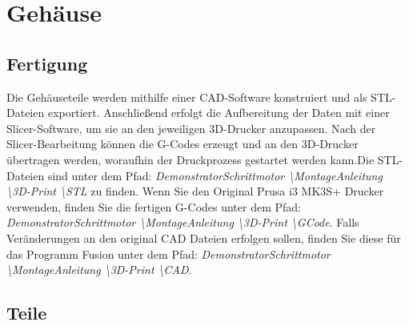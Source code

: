 %



\chapter{Gehäuse}

\section{Fertigung}

Die Gehäuseteile werden mithilfe einer CAD-Software konstruiert und als STL-Dateien exportiert. Anschließend erfolgt die Aufbereitung der Daten mit einer Slicer-Software, um sie an den jeweiligen 3D-Drucker anzupassen. Nach der Slicer-Bearbeitung können die G-Codes erzeugt und an den 3D-Drucker übertragen werden, woraufhin der Druckprozess gestartet werden kann.Die STL-Dateien sind unter dem Pfad: \emph{DemonstratorSchrittmotor \textbackslash MontageAnleitung \textbackslash 3D-Print \textbackslash STL} zu finden. Wenn Sie den Original Prusa i3 MK3S+ Drucker verwenden, finden Sie die fertigen G-Codes unter dem Pfad: \emph{DemonstratorSchrittmotor \textbackslash MontageAnleitung \textbackslash 3D-Print \textbackslash GCode}. Falls Veränderungen an den original CAD Dateien erfolgen sollen, finden Sie diese für das Programm Fusion unter dem Pfad: \emph{DemonstratorSchrittmotor \textbackslash MontageAnleitung \textbackslash 3D-Print \textbackslash CAD}.

\section{Teile}

